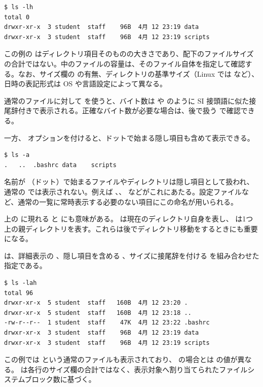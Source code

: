 \begin{lstlisting}[numbers=none, xleftmargin=2\zw]
$ ls -lh
total 0
drwxr-xr-x  3 student  staff    96B  4月 12 23:19 data
drwxr-xr-x  3 student  staff    96B  4月 12 23:19 scripts
\end{lstlisting}

この例の  はディレクトリ項目そのものの大きさであり、配下のファイルサイズの合計ではない。中のファイルの容量は、そのファイル自体を指定して確認する。なお、サイズ欄の  の有無、ディレクトリの基準サイズ（Linux では  など）、日時の表記形式は OS や言語設定によって異なる。

通常のファイルに対して  を使うと、バイト数は  や  のように SI 接頭語に似た接尾辞付きで表示される。正確なバイト数が必要な場合は、後で扱う  で確認できる。

一方、 オプションを付けると、ドットで始まる隠し項目も含めて表示できる。

\begin{lstlisting}[numbers=none, xleftmargin=2\zw]
$ ls -a
.	..	.bashrc	data	scripts
\end{lstlisting}

名前が （ドット）で始まるファイルやディレクトリは隠し項目として扱われ、通常の  では表示されない。例えば 、、 などがこれにあたる。設定ファイルなど、通常の一覧に常時表示する必要のない項目にこの命名が用いられる。

上の  に現れる  と  にも意味がある。 は現在のディレクトリ自身を表し、 は1つ上の親ディレクトリを表す。これらは後でディレクトリ移動をするときにも重要になる。

 は、詳細表示の 、隠し項目を含める 、サイズに接尾辞を付ける  を組み合わせた指定である。

\begin{lstlisting}[numbers=none, xleftmargin=2\zw]
$ ls -lah
total 96
drwxr-xr-x  5 student  staff   160B  4月 12 23:20 .
drwxr-xr-x  5 student  staff   160B  4月 12 23:18 ..
-rw-r--r--  1 student  staff    47K  4月 12 23:22 .bashrc
drwxr-xr-x  3 student  staff    96B  4月 12 23:19 data
drwxr-xr-x  3 student  staff    96B  4月 12 23:19 scripts
\end{lstlisting}

この例では  という通常のファイルも表示されており、 の場合とは  の値が異なる。 は各行のサイズ欄の合計ではなく、表示対象へ割り当てられたファイルシステムブロック数に基づく。

